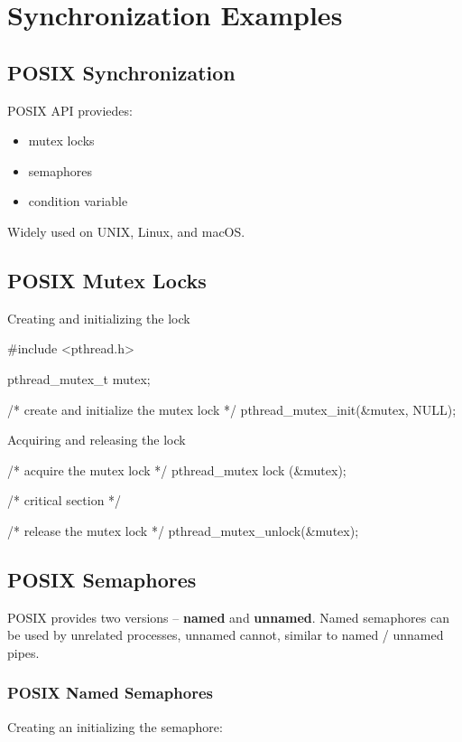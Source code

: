 \chapter{Synchronization Examples}
\section{POSIX Synchronization}

POSIX API proviedes:
\begin{itemize}
    \item mutex locks
    \item semaphores
    \item condition variable
\end{itemize}

Widely used on UNIX, Linux, and macOS.

\section{POSIX Mutex Locks}

Creating and initializing the lock

\begin{codeInC}
#include <pthread.h>

pthread_mutex_t mutex;

/* create and initialize the mutex lock */
pthread_mutex_init(&mutex, NULL);

\end{codeInC}

Acquiring and releasing the lock

\begin{codeInC}
/* acquire the mutex lock */
pthread_mutex lock (&mutex);

/* critical section */

/* release the mutex lock */
pthread_mutex_unlock(&mutex);
\end{codeInC}

\newpage
\section{POSIX Semaphores}

POSIX provides two versions – \textbf{named} and \textbf{unnamed}. Named semaphores can be used by unrelated processes, unnamed
cannot, similar to named / unnamed pipes.

\subsection{POSIX Named Semaphores}
Creating an initializing the semaphore:

